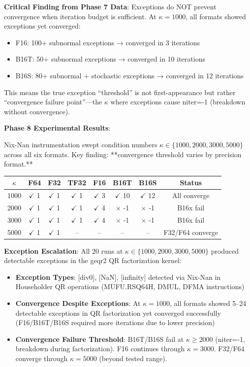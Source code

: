 \documentclass[11pt,a4paper]{article}
\begin{document}
\textbf{Critical Finding from Phase 7 Data}:
Exceptions do NOT prevent convergence when iteration budget is sufficient. At $\kappa=1000$, all formats showed exceptions yet converged:
\begin{itemize}
  \item F16: 100+ subnormal exceptions → converged in 3 iterations
  \item B16T: 50+ subnormal exceptions → converged in 10 iterations
  \item B16S: 80+ subnormal + stochastic exceptions → converged in 12 iterations
\end{itemize}

This means the true exception ``threshold'' is not first-appearance but rather ``convergence failure point''—the $\kappa$ where exceptions cause niter=-1 (breakdown without convergence).

\textbf{Phase 8 Experimental Results}:

Nix-Nan instrumentation swept condition numbers $\kappa \in \{1000, 2000, 3000, 5000\}$ across all six formats. Key finding: **convergence threshold varies by precision format.**

\begin{center}
\begin{tabular}{c|cccccc|c}
$\kappa$ & F64 & F32 & TF32 & F16 & B16T & B16S & Status \\
\hline
1000 & $\checkmark$ 1 & $\checkmark$ 1 & $\checkmark$ 1 & $\checkmark$ 3 & $\checkmark$ 10 & $\checkmark$ 12 & All converge \\
2000 & $\checkmark$ 1 & $\checkmark$ 1 & $\checkmark$ 1 & $\checkmark$ 4 & $\times$ -1 & $\times$ -1 & B16x fail \\
3000 & $\checkmark$ 1 & $\checkmark$ 1 & $\checkmark$ 1 & $\checkmark$ 4 & $\times$ -1 & $\times$ -1 & B16x fail \\
5000 & $\checkmark$ 1 & $\checkmark$ 1 & -- & -- & -- & -- & F32/F64 converge \\
\end{tabular}
\end{center}

\textbf{Exception Escalation}: All 20 runs at $\kappa \in \{1000, 2000, 3000, 5000\}$ produced detectable exceptions in the geqr2 QR factorization kernel:
\begin{itemize}
  \item \textbf{Exception Types}: [div0], [NaN], [infinity] detected via Nix-Nan in Householder QR operations (MUFU.RSQ64H, DMUL, DFMA instructions)
  \item \textbf{Convergence Despite Exceptions}: At $\kappa=1000$, all formats showed 5--24 detectable exceptions in QR factorization yet converged successfully (F16/B16T/B16S required more iterations due to lower precision)
  \item \textbf{Convergence Failure Threshold}: B16T/B16S fail at $\kappa \geq 2000$ (niter=-1, breakdown during factorization). F16 continues through $\kappa=3000$. F32/F64 converge through $\kappa=5000$ (beyond tested range).
\end{itemize}
\end{document}
